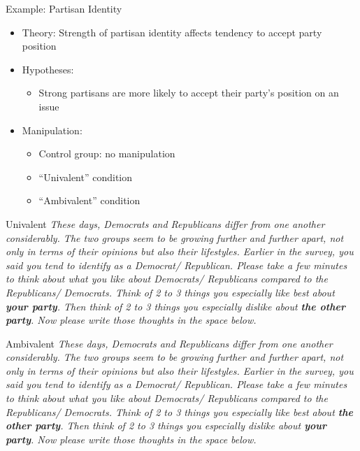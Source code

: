 \documentclass[
  ignorenonframetext,
]{beamer}
\providecommand{\tightlist}{%
  \setlength{\itemsep}{0pt}\setlength{\parskip}{0pt}}
\begin{document}
\begin{frame}{Example: Partisan Identity}
\protect\hypertarget{example-partisan-identity}{}
\begin{itemize}
\tightlist
\item
  Theory: Strength of partisan identity affects tendency to accept party
  position
\item
  Hypotheses:

  \begin{itemize}
  \tightlist
  \item
    Strong partisans are more likely to accept their party's position on
    an issue
  \end{itemize}
\item
  Manipulation:

  \begin{itemize}
  \tightlist
  \item
    Control group: no manipulation
  \item
    ``Univalent'' condition
  \item
    ``Ambivalent'' condition
  \end{itemize}
\end{itemize}
\end{frame}

\begin{frame}{Univalent}
\protect\hypertarget{univalent}{}
\emph{These days, Democrats and Republicans differ from one another
considerably. The two groups seem to be growing further and further
apart, not only in terms of their opinions but also their lifestyles.
Earlier in the survey, you said you tend to identify as a Democrat/
Republican. Please take a few minutes to think about what you like about
Democrats/ Republicans compared to the Republicans/ Democrats. Think of
2 to 3 things you especially like best about \textbf{your party}. Then
think of 2 to 3 things you especially dislike about \textbf{the other
party}. Now please write those thoughts in the space below.}
\end{frame}

\begin{frame}{Ambivalent}
\protect\hypertarget{ambivalent}{}
\emph{These days, Democrats and Republicans differ from one another
considerably. The two groups seem to be growing further and further
apart, not only in terms of their opinions but also their lifestyles.
Earlier in the survey, you said you tend to identify as a Democrat/
Republican. Please take a few minutes to think about what you like about
Democrats/ Republicans compared to the Republicans/ Democrats. Think of
2 to 3 things you especially like best about \textbf{the other party}.
Then think of 2 to 3 things you especially dislike about \textbf{your
party}. Now please write those thoughts in the space below.}
\end{frame}
\end{document}
